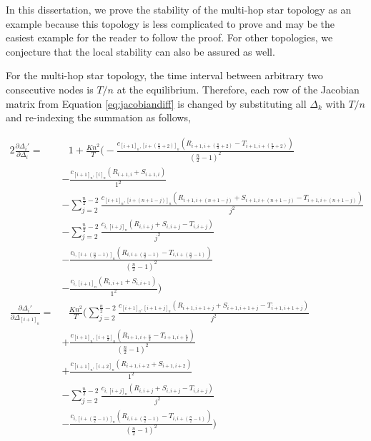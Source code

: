 In this dissertation, we prove the stability of the multi-hop star topology as an example because this topology is less complicated to prove and may be the easiest example for the reader to follow the proof. For other topologies, we conjecture that the local stability can also be assured as well.

For the multi-hop star topology, the time interval between arbitrary two consecutive nodes is $T/n$ at the equilibrium. Therefore, each row of the Jacobian matrix from Equation \ref{eq:jacobiandiff} is changed by substituting all $\Delta_{k}$ with $T/n$ and re-indexing the summation as follows,

\begin{alignat}{2}
\frac{\partial \Delta_i'}{\partial \Delta_i} =& \text{ }1 + \frac{Kn^2}{T} \Bigg(
  - \frac{c_{[i+1]_n,[i+(\frac{n}{2}+2)]_n}(R_{i+1,i+(\frac{n}{2}+2)} - T_{i+1,i+(\frac{n}{2}+2)})}{(\frac{n}{2}-1)^2} \nonumber \\
  &- \frac{c_{[i+1]_n,[i]_n}(R_{i+1,i} + S_{i+1,i})}{1^2} \nonumber \\
  &- \sum_{j=2}^{\frac{n}{2}-2}  \frac{c_{[i+1]_n,[i+(n+1-j)]_n}(R_{i+1,i+(n+1-j)} + S_{i+1,i+(n+1-j)} - T_{i+1,i+(n+1-j)})}{j^2} \nonumber \\
  &- \sum_{j= 2}^{\frac{n}{2}-2}  \frac{c_{i,[i+j]_n}(R_{i,i+j} + S_{i,i+j} - T_{i,i+j})}{j^2} \nonumber \\
  &- \frac{c_{i,[i+(\frac{n}{2}-1)]_n}(R_{i,i+(\frac{n}{2}-1)} - T_{i,i+(\frac{n}{2}-1)})}{(\frac{n}{2}-1)^2} \nonumber \\
  &- \frac{c_{i,[i+1]_n}(R_{i,i+1} + S_{i,i+1})}{1^2} \Bigg)\nonumber \\
\frac{\partial \Delta_i'}{\partial \Delta_{[i+1]_n}} =& \text{ }\frac{Kn^2}{T} \Bigg(\sum_{j=2}^{\frac{n}{2}-2}  \frac{c_{[i+1]_n,[i+1+j]_n}(R_{i+1,i+1+j} + S_{i+1,i+1+j} - T_{i+1,i+1+j})}{j^2} \nonumber \\
  &+ \frac{c_{[i+1]_n,[i+\frac{n}{2}]_n}(R_{i+1,i+\frac{n}{2}} - T_{i+1,i+\frac{n}{2}})}{(\frac{n}{2}-1)^2} \nonumber \\
  &+ \frac{c_{[i+1]_n,[i+2]_n}(R_{i+1,i+2} + S_{i+1,i+2})}{1^2} \nonumber \\
  &- \sum_{j= 2}^{\frac{n}{2}-2}  \frac{c_{i,[i+j]_n}(R_{i,i+j} + S_{i,i+j} - T_{i,i+j})}{j^2} \nonumber \\
  &- \frac{c_{i,[i+(\frac{n}{2}-1)]_n}(R_{i,i+(\frac{n}{2}-1)} - T_{i,i+(\frac{n}{2}-1)})}{(\frac{n}{2}-1)^2} \Bigg) \nonumber \\

\end{alignat}
